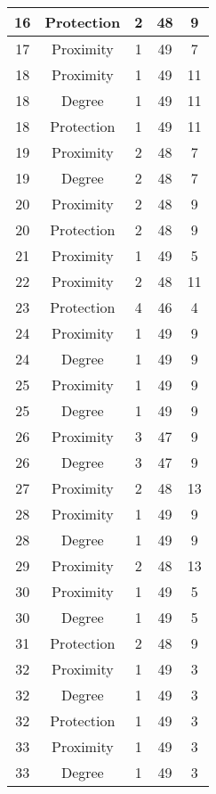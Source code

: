 \documentclass[results.tex]{subfiles}
\begin{document}
\begin{center}
\begin{tabular}{| c || c | c | c | c |}
    \hline
    16 & Protection & 2 & 48 & 9 \\ 
    \hline
    17 & Proximity & 1 & 49 & 7 \\ 
    \hline
    18 & Proximity & 1 & 49 & 11 \\ 
    \hline
    18 & Degree & 1 & 49 & 11 \\ 
    \hline
    18 & Protection & 1 & 49 & 11 \\ 
    \hline
    19 & Proximity & 2 & 48 & 7 \\ 
    \hline
    19 & Degree & 2 & 48 & 7 \\ 
    \hline
    20 & Proximity & 2 & 48 & 9 \\ 
    \hline
    20 & Protection & 2 & 48 & 9 \\ 
    \hline
    21 & Proximity & 1 & 49 & 5 \\ 
    \hline
    22 & Proximity & 2 & 48 & 11 \\ 
    \hline
    23 & Protection & 4 & 46 & 4 \\ 
    \hline
    24 & Proximity & 1 & 49 & 9 \\ 
    \hline
    24 & Degree & 1 & 49 & 9 \\ 
    \hline
    25 & Proximity & 1 & 49 & 9 \\ 
    \hline
    25 & Degree & 1 & 49 & 9 \\ 
    \hline
    26 & Proximity & 3 & 47 & 9 \\ 
    \hline
    26 & Degree & 3 & 47 & 9 \\ 
    \hline
    27 & Proximity & 2 & 48 & 13 \\ 
    \hline
    28 & Proximity & 1 & 49 & 9 \\ 
    \hline
    28 & Degree & 1 & 49 & 9 \\ 
    \hline
    29 & Proximity & 2 & 48 & 13 \\ 
    \hline
    30 & Proximity & 1 & 49 & 5 \\ 
    \hline
    30 & Degree & 1 & 49 & 5 \\ 
    \hline
    31 & Protection & 2 & 48 & 9 \\ 
    \hline
    32 & Proximity & 1 & 49 & 3 \\ 
    \hline
    32 & Degree & 1 & 49 & 3 \\ 
    \hline
    32 & Protection & 1 & 49 & 3 \\ 
    \hline
    33 & Proximity & 1 & 49 & 3 \\ 
    \hline
    33 & Degree & 1 & 49 & 3 \\ 
    \hline

\end{tabular}
\end{center}
\end{document}
